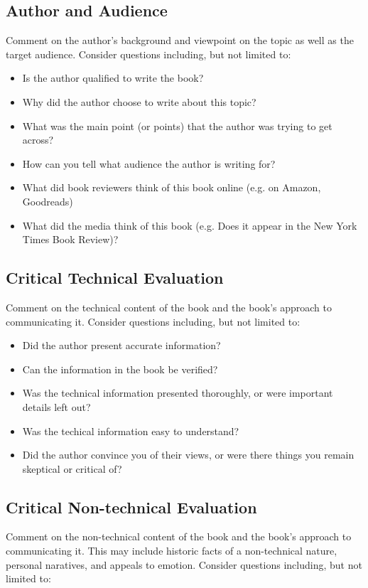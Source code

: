 \documentclass{article}
\begin{document}
\subsection{Author and Audience}
Comment on the author's background and viewpoint on the topic as well as the 
target audience. 
Consider questions including, but not limited to:
\begin{itemize}
        \item Is the author qualified to write the book?
        \item Why did the author choose to write about this topic? 
        \item What was the main point (or points) that the author was trying to get across? 
        \item How can you tell what audience the author is writing for? 
        \item What did book reviewers think of this book online (e.g. on 
                Amazon, Goodreads)
        \item What did the media think of this book (e.g. Does it appear 
                in the New York Times Book Review)?
\end{itemize}


\subsection{Critical Technical Evaluation}
Comment on the technical content of the book and the book's approach to communicating it. 
Consider questions including, but not limited to:

\begin{itemize}
        \item Did the author present accurate information? 
	\item Can the information in the book be verified?
	\item Was the technical information presented thoroughly, or were important details left out? 
	\item Was the techical information easy to understand? 
	\item Did the author convince you of their views, or were there things you remain skeptical or critical of?
\end{itemize}

\subsection{Critical Non-technical Evaluation}
Comment on the non-technical content of the book and the book's approach to communicating it. 
This may include historic facts of a non-technical nature, personal naratives, and appeals to emotion.
Consider questions including, but not limited to:
\end{document}
